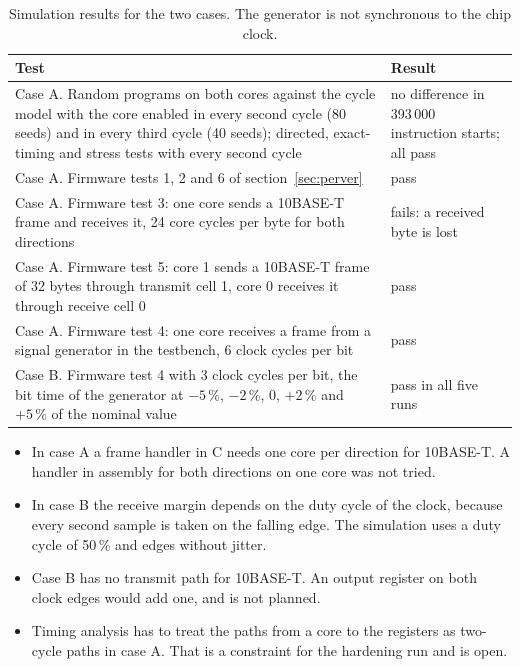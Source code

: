 \documentclass[10pt,a4paper]{article}
\begin{document}
\begin{table}[H]
\centering\small
\begin{tabularx}{\linewidth}{@{}LL@{}}
\toprule
Test & Result \\
\midrule
Case A. Random programs on both cores against the cycle model with the core enabled in every second cycle (80 seeds) and in every third cycle (40 seeds); directed, exact-timing and stress tests with every second cycle & no difference in 393\,000 instruction starts; all pass \\
Case A. Firmware tests 1, 2 and 6 of section~\ref{sec:perver} & pass \\
Case A. Firmware test 3: one core sends a 10BASE-T frame and receives it, 24 core cycles per byte for both directions & fails: a received byte is lost \\
Case A. Firmware test 5: core 1 sends a 10BASE-T frame of 32 bytes through transmit cell 1, core 0 receives it through receive cell 0 & pass \\
Case A. Firmware test 4: one core receives a frame from a signal generator in the testbench, 6 clock cycles per bit & pass \\
Case B. Firmware test 4 with 3 clock cycles per bit, the bit time of the generator at $-5\,\%$, $-2\,\%$, 0, $+2\,\%$ and $+5\,\%$ of the nominal value & pass in all five runs \\
\bottomrule
\end{tabularx}
\caption{Simulation results for the two cases. The generator is not synchronous to the chip clock.}
\end{table}

\begin{itemize}
\item In case A a frame handler in C needs one core per direction for 10BASE-T. A handler in assembly for
both directions on one core was not tried.
\item In case B the receive margin depends on the duty cycle of the clock, because every second sample is
taken on the falling edge. The simulation uses a duty cycle of 50\,\% and edges without jitter.
\item Case B has no transmit path for 10BASE-T. An output register on both clock edges would add one, and is
not planned.
\item Timing analysis has to treat the paths from a core to the registers as two-cycle paths in case A. That
is a constraint for the hardening run and is open.
\end{itemize}
\end{document}
